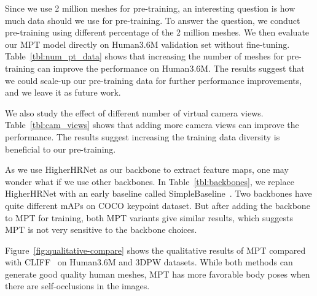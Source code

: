 Since we use 2 million meshes for pre-training, an interesting question is how much data should we use for pre-training. To answer the question, we conduct pre-training using different percentage of the 2 million meshes. We then evaluate our MPT model directly on Human3.6M validation set without fine-tuning. Table~\ref{tbl:num_pt_data} shows that increasing the number of meshes for pre-training can improve the performance on Human3.6M. The results suggest that we could scale-up our pre-training data for further performance improvements, and we leave it as future work. 

We also study the effect of different number of virtual camera views. Table~\ref{tbl:cam_views} shows that adding more camera views can improve the performance. The results suggest increasing the training data diversity is beneficial to our pre-training. 



 As we use HigherHRNet as our backbone to extract feature maps, one may wonder what if we use other backbones. In Table~\ref{tbl:backbones}, we replace HigherHRNet with an early baseline called SimpleBaseline~\cite{xiao2018simple}. Two backbones have quite different mAPs on COCO keypoint dataset. But after adding the backbone to MPT for training, both MPT variants give similar results, which suggests MPT is not very sensitive to the backbone choices.


 Figure~\ref{fig:qualitative-compare} shows the  qualitative results of MPT compared with CLIFF~\cite{li2022cliff} on Human3.6M and 3DPW datasets. While both methods can generate good quality human meshes, MPT has more favorable body poses when there are self-occlusions in the images. 


